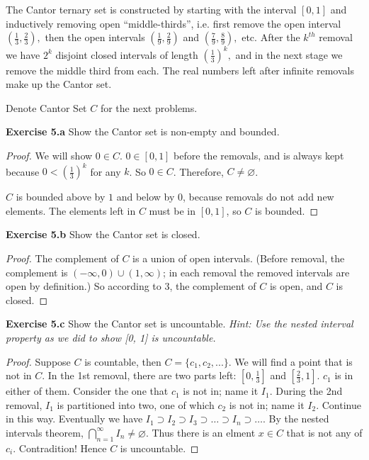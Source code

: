 \documentclass[12pt]{article}
\theoremstyle{definition}
\numberwithin{equation}{subsection}
\begin{document}
The Cantor ternary set is constructed by starting with the interval $[0,1]$
and inductively removing open ``middle-thirds'', i.e. first remove the open
interval $\left(\frac{1}{3}, \frac{2}{3}\right),$ then the open intervals $\left(\frac{1}{9}, \frac{2}{9}\right)$ and $\left(\frac{7}{9}, \frac{8}{9}\right),$ etc. After the
$k^{t h}$ removal we have $2^{k}$ disjoint closed intervals of length $\left(\frac{1}{3}\right)^{k},$ and in the
next stage we remove the middle third from each. The real numbers left
after infinite removals make up the Cantor set.

\bigskip
Denote Cantor Set $C$ for the next problems.
\bigskip


\textbf{Exercise 5.a} Show the Cantor set is non-empty and bounded.
\begin{proof}

    We will show $0\in C$. $0\in[0,1]$ before the removals, and is always kept because $0<\left(\frac{1}{3}\right)^{k}$ for any $k$. So $0\in C$. Therefore, $C\neq\varnothing$. 

    $C$ is bounded above by $1$ and below by $0$, because removals do not add new elements. The elements left in $C$ must be in $[0,1]$, so $C$ is bounded. 
\end{proof}

\textbf{Exercise 5.b} Show the Cantor set is closed.
\begin{proof}
    The complement of $C$ is a union of open intervals. (Before removal, the complement is $(-\infty, 0) \cup (1, \infty)$; in each removal the removed intervals are open by definition.) So according to 3, the complement of $C$ is open, and $C$ is closed. 
\end{proof}

\textbf{Exercise 5.c} Show the Cantor set is uncountable. \textit{Hint: Use the nested interval property as we did to show [0, 1] is uncountable.}
\begin{proof}
    Suppose $C$ is countable, then $C = \{c_1, c_2, ...\}$. We will find a point that is not in $C$. In the 1st removal, there are two parts left: $[0,\frac{1}{3}]$ and $[\frac{2}{3}, 1]$. $c_1$ is in either of them. Consider the one that $c_1$ is not in; name it $I_1$. During the 2nd removal, $I_1$ is partitioned into two, one of which $c_2$ is not in; name it $I_2$. Continue in this way. Eventually we have $I_{1} \supset I_{2} \supset I_{3} \supset \ldots \supset I_{n} \supset \ldots$. By the nested intervals theorem, $\bigcap_{n=1}^{\infty} I_{n} \neq \varnothing$. Thus there is an elment $x\in C$ that is not any of $c_i$. Contradition! Hence $C$ is uncountable. 
\end{proof}
\end{document}
